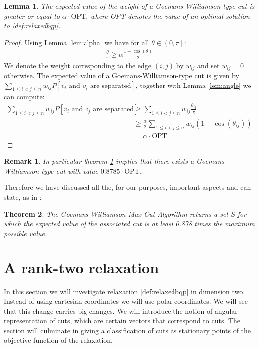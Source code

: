 \documentclass[12pt,a4paper]{article}
\theoremstyle{mythm}
\newtheorem{thm}{Theorem}[section]
\newtheorem{lem}[thm]{Lemma}
\newtheorem*{rem}{Remark}
\begin{document}
\begin{lem}
\label{lem:GWalgo} 
The expected value of the weight of a Goemans-Williamson-type cut is greater or equal to $ \alpha \cdot \text{OPT}  $, where OPT denotes the value of an optimal solution to
\ref{def:relaxedbqp}.
\end{lem} 
\begin{proof}
Using Lemma \ref{lem:alpha} we have for all $ \theta \in \left( 0, \pi  \right]   $:
\begin{align*}
\frac{ \theta }{ \pi  } \geq \alpha \frac{ 1 - \cos( \theta )  }{ 2 }  
\end{align*} 
We denote the weight corresponding to the edge $ \left( i,j \right)  $ by $ w _{ ij }  $ and set $ w _{ ij } = 0 $ otherwise.
The expected value of a Goemans-Williamson-type cut is given by \\ $ \sum_{ 1 \leq i < j \leq n    }^{  } w _{ ij }  P \left[ v_i \text{ and } v_j \text{ are separated}  \right]
$, together with Lemma \ref{lem:angle} we can compute:
\begin{align*}
 \sum_{ 1 \leq i < j \leq n    }^{  } w _{ ij }  P \left[ v_i \text{ and } v_j \text{ are separated}  \right]
& \geq \sum_{ 1 \leq i < j \leq n    }^{  } w _{ ij }  \frac{ \theta _{ ij }  }{ \pi } \\
&\geq \frac{ \alpha }{ 2 }  \sum_{ 1 \leq i < j \leq n    }^{  } w _{ ij }  \left( 1 - \cos( \theta _{ ij }  )  \right)  \\
&= \alpha \cdot \text{OPT} 
\end{align*} 
\end{proof}
\begin{rem}
In particular theorem \ref{lem:GWalgo} implies that there exists a Goemans-Williamson-type cut with value $ 0.8785 \cdot \text{OPT} $.
\end{rem} 

Therefore we have discussed all the, for our purposes, important aspects and can state, as in \cite[Theorem 16.12]{Korte2018}:
\begin{thm}
The Goemans-Williamson  Max-Cut-Algorithm returns a set $ S $ for which the expected value of 
the associated cut is at least 0.878 times the maximum possible value.
\end{thm} 

\section{A rank-two relaxation} 
\label{rankTworelaxation} 
In this section we will investigate relaxation \ref{def:relaxedbqp} in dimension two.
Instead of using cartesian coordinates we will use polar coordinates.
We will see that this change carries big changes.
We will introduce the notion of angular representation of cuts, which are certain vectors that correspond to cuts.
The section will culminate in giving a classification of cuts as stationary points of the objective function of the relaxation.
\end{document}
